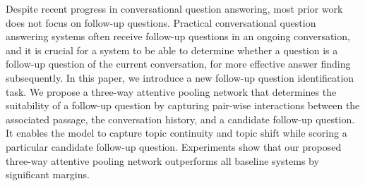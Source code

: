 Despite recent progress in conversational question answering, most prior work does not focus on follow-up questions. Practical conversational question answering systems often receive follow-up questions in an ongoing conversation, and it is crucial for a system to be able to determine whether a question is a follow-up question of the current conversation, for more effective answer finding subsequently.  In this paper, we introduce a new follow-up question identification task. We propose a three-way attentive pooling network that determines the suitability of a follow-up question by capturing pair-wise interactions between the associated passage, the conversation history, and a candidate follow-up question. It enables the model to capture topic continuity and topic shift while scoring a particular candidate follow-up question. Experiments show that our proposed three-way attentive pooling network outperforms all baseline systems by significant margins.
